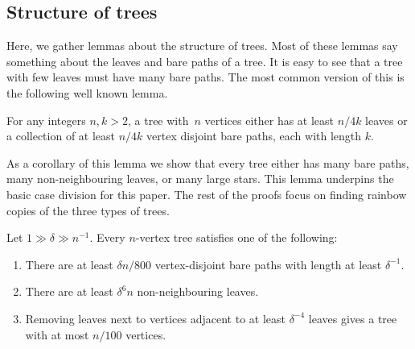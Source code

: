 \subsection{Structure of trees}\label{Section_structure_of_trees}
Here, we gather lemmas about the structure of trees. Most of these lemmas say something about the leaves and bare paths of  a tree. It is easy to see that a tree with few leaves must have many bare paths. The most common version of this is the following well known lemma.
\begin{lemma}\label{split} For any integers $n,k>2$, a tree with~$n$ vertices either has at least $n/4k$ leaves or a collection of at least $n/4k$ vertex disjoint bare paths, each with length $k$.%
\end{lemma}
As a corollary of this lemma we show that every tree either has many bare paths, many non-neighbouring leaves, or many large stars. This lemma underpins the basic case division for this paper. The rest of the proofs focus on finding rainbow copies of the three types of trees.
\begin{lemma}\label{Lemma_case_division}
Let $1\gg \delta \gg n^{-1}$. Every $n$-vertex tree satisfies one of the following:
\begin{enumerate}[label= \Alph{enumi}]
\item There are at least $\delta n/800$ vertex-disjoint bare paths with length at least $\delta^{-1}$.
\item There are at least $\delta^6 n$ non-neighbouring leaves.
\item Removing leaves next to vertices adjacent to at least $\delta^{-4}$ leaves gives a tree with at most
$n/100$ vertices.
\end{enumerate}
\end{lemma}
